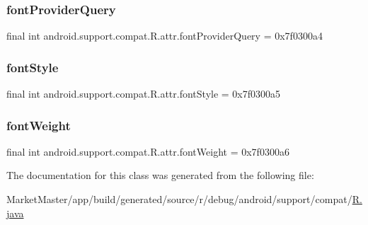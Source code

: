 \subsubsection{\texorpdfstring{font\+Provider\+Query}{fontProviderQuery}}
{\footnotesize\ttfamily final int android.\+support.\+compat.\+R.\+attr.\+font\+Provider\+Query = 0x7f0300a4\hspace{0.3cm}{\ttfamily [static]}}

\mbox{\label{classandroid_1_1support_1_1compat_1_1R_1_1attr_aafb47e665f110a6e8fd90833aefd0e1f}} 
\subsubsection{\texorpdfstring{font\+Style}{fontStyle}}
{\footnotesize\ttfamily final int android.\+support.\+compat.\+R.\+attr.\+font\+Style = 0x7f0300a5\hspace{0.3cm}{\ttfamily [static]}}

\mbox{\label{classandroid_1_1support_1_1compat_1_1R_1_1attr_ab95e33bc7552ac24227086aae1de1973}} 
\subsubsection{\texorpdfstring{font\+Weight}{fontWeight}}
{\footnotesize\ttfamily final int android.\+support.\+compat.\+R.\+attr.\+font\+Weight = 0x7f0300a6\hspace{0.3cm}{\ttfamily [static]}}



The documentation for this class was generated from the following file\+:\begin{DoxyCompactItemize}
\item 
Market\+Master/app/build/generated/source/r/debug/android/support/compat/\mbox{\hyperlink{debug_2android_2support_2compat_2R_8java}{R.\+java}}\end{DoxyCompactItemize}
